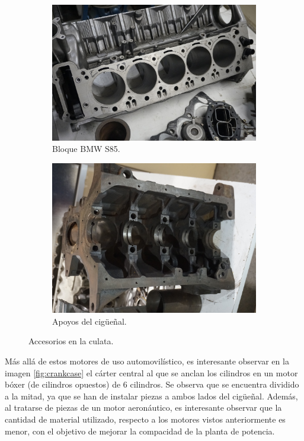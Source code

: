 \begin{figure}[H]
	\centering
	\begin{subfigure}[b]{0.45\textwidth}
		\centering
		\includegraphics[width=\linewidth]{Figures/02/m3/bloq_bmw_2.jpg}
		\caption{Bloque BMW S85.}
		\label{fig:bloq_bmw}
	\end{subfigure}
	\hfill
	\begin{subfigure}[b]{0.45\textwidth}
 		\centering
 		\includegraphics[width=\linewidth]{Figures/02/m3/bloq_cig.jpg}
 		\caption{Apoyos del cigüeñal.}
		\label{fig:bloq_cig}
	\end{subfigure}    
	\caption{Accesorios en la culata.}
	\label{fig:auto_block}
\end{figure}

Más allá de estos motores de uso automovilístico, es interesante observar en la imagen \ref{fig:crankcase} el cárter central al que se anclan los cilindros en un motor bóxer (de cilindros opuestos) de 6 cilindros. Se observa que se encuentra dividido a la mitad, ya que se han de instalar piezas a ambos lados del cigüeñal. Además, al tratarse de piezas de un motor aeronáutico, es interesante observar que la cantidad de material utilizado, respecto a los motores vistos anteriormente es menor, con el objetivo de mejorar la compacidad de la planta de potencia.


